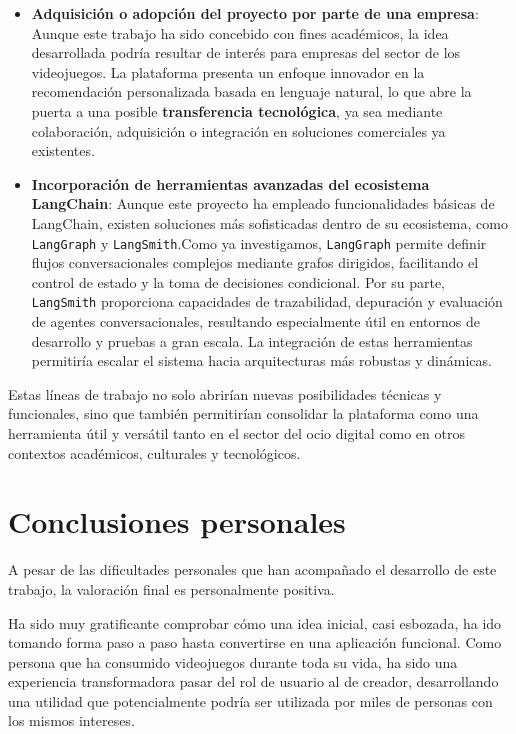 \begin{itemize}
	
	\item \textbf{Adquisición o adopción del proyecto por parte de una empresa}:
	Aunque este trabajo ha sido concebido con fines académicos, la idea desarrollada podría resultar de interés para empresas del sector de los videojuegos. La plataforma presenta un enfoque innovador en la recomendación personalizada basada en lenguaje natural, lo que abre la puerta a una posible \textbf{transferencia tecnológica}, ya sea mediante colaboración, adquisición o integración en soluciones comerciales ya existentes.
	
	
	\item \textbf{Incorporación de herramientas avanzadas del ecosistema LangChain}:
	Aunque este proyecto ha empleado funcionalidades básicas de LangChain, existen soluciones más sofisticadas dentro de su ecosistema, como \texttt{LangGraph} y \texttt{LangSmith}.Como ya investigamos, \texttt{LangGraph} permite definir flujos conversacionales complejos mediante grafos dirigidos, facilitando el control de estado y la toma de decisiones condicional. Por su parte, \texttt{LangSmith} proporciona capacidades de trazabilidad, depuración y evaluación de agentes conversacionales, resultando especialmente útil en entornos de desarrollo y pruebas a gran escala. La integración de estas herramientas permitiría escalar el sistema hacia arquitecturas más robustas y dinámicas.
	
\end{itemize}

Estas líneas de trabajo no solo abrirían nuevas posibilidades técnicas y funcionales, sino que también permitirían consolidar la plataforma como una herramienta útil y versátil tanto en el sector del ocio digital como en otros contextos académicos, culturales y tecnológicos.


\newpage
\section{Conclusiones personales}

A pesar de las dificultades personales que han acompañado el desarrollo de este trabajo, la valoración final es personalmente positiva.

Ha sido muy gratificante comprobar cómo una idea inicial, casi esbozada, ha ido tomando forma paso a paso hasta convertirse en una aplicación funcional. Como persona que ha consumido videojuegos durante toda su vida, ha sido una experiencia transformadora pasar del rol de usuario al de creador, desarrollando una utilidad que potencialmente podría ser utilizada por miles de personas con los mismos intereses.

